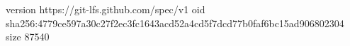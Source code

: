 version https://git-lfs.github.com/spec/v1
oid sha256:4779ce597a30c27f2ec3fc1643acd52a4cd5f7dcd77b0faf6bc15ad906802304
size 87540
